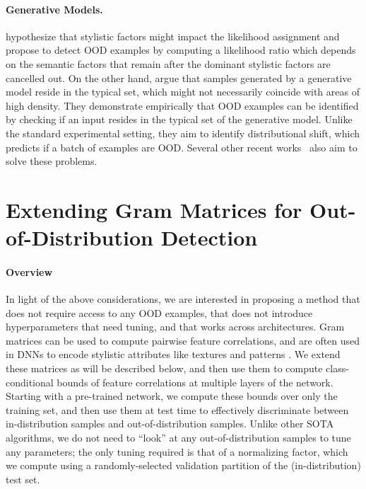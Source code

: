 \documentclass{article}
\begin{document}
\paragraph{Generative Models.}
\cite{ren2019likelihood} hypothesize that stylistic factors might impact the likelihood assignment and propose to detect OOD examples by computing a likelihood ratio which depends on the semantic factors that remain after the dominant stylistic factors are cancelled out. On the other hand, \cite{nalisnick2019detecting} argue that samples generated by a generative model reside in the typical set, which might not necessarily coincide with areas of high density. They demonstrate empirically that OOD examples can be identified by checking if an input resides in the typical set of the generative model. Unlike the standard experimental setting, they aim to identify distributional shift, which predicts if a batch of examples are OOD. Several other recent works~\citep{gen1,gen2,gen3,gen4} also aim to solve these problems.

\section{Extending Gram Matrices for Out-of-Distribution Detection}
\label{s:gram}

\paragraph{Overview} In light of the above considerations, we are interested in proposing a method that does not require access to any OOD examples, that does not introduce hyperparameters that need tuning, and that works across architectures. Gram matrices can be used to compute pairwise feature correlations, and are often used in DNNs to encode stylistic attributes like textures and patterns \citep{style}. We extend these matrices as will be described below, and then use them to compute class-conditional bounds of feature correlations at multiple layers of the network. Starting with a pre-trained network, we compute these bounds over only the training set, and then use them at test time to effectively discriminate between in-distribution samples and out-of-distribution samples. Unlike other SOTA algorithms, we do not need to ``look'' at any out-of-distribution samples to tune any parameters; the only tuning required is that of a normalizing factor, which we compute using a randomly-selected validation partition of the (in-distribution) test set.
\end{document}
